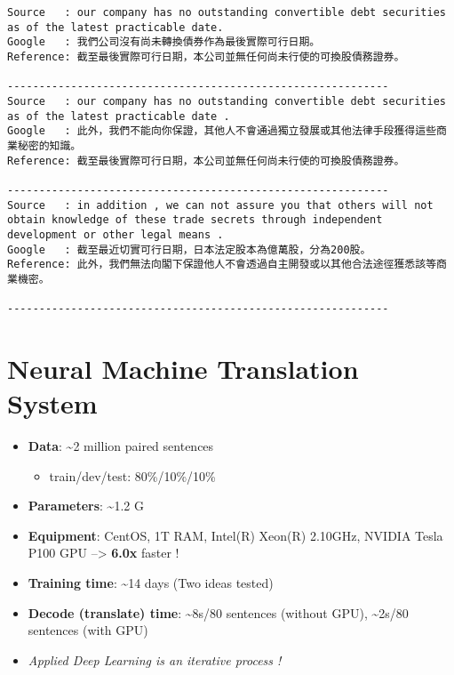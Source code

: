 \documentclass[11pt]{article}
\providecommand{\tightlist}{%
      \setlength{\itemsep}{0pt}\setlength{\parskip}{0pt}}
\begin{document}
    \begin{Verbatim}[commandchars=\\\{\}]
Source   : our company has no outstanding convertible debt securities as of the latest practicable date.
Google   : 我們公司沒有尚未轉換債券作為最後實際可行日期。
Reference: 截至最後實際可行日期，本公司並無任何尚未行使的可換股債務證券。

------------------------------------------------------------
Source   : our company has no outstanding convertible debt securities as of the latest practicable date .
Google   : 此外，我們不能向你保證，其他人不會通過獨立發展或其他法律手段獲得這些商業秘密的知識。
Reference: 截至最後實際可行日期，本公司並無任何尚未行使的可換股債務證券。

------------------------------------------------------------
Source   : in addition , we can not assure you that others will not obtain knowledge of these trade secrets through independent development or other legal means .
Google   : 截至最近切實可行日期，日本法定股本為億萬股，分為200股。
Reference: 此外，我們無法向閣下保證他人不會透過自主開發或以其他合法途徑獲悉該等商業機密。

------------------------------------------------------------

    \end{Verbatim}

    \section{Neural Machine Translation
System}\label{neural-machine-translation-system}

\begin{itemize}
\tightlist
\item
  \textbf{Data}: \textasciitilde{}2 million paired sentences

  \begin{itemize}
  \tightlist
  \item
    train/dev/test: 80\%/10\%/10\%
  \end{itemize}
\item
  \textbf{Parameters}: \textasciitilde{}1.2 G
\item
  \textbf{Equipment}: CentOS, 1T RAM, Intel(R) Xeon(R) 2.10GHz, NVIDIA
  Tesla P100 GPU --\textgreater{} \textbf{6.0x} faster !
\item
  \textbf{Training time}: \textasciitilde{}14 days (Two ideas tested)
\item
  \textbf{Decode (translate) time}: \textasciitilde{}8s/80 sentences
  (without GPU), \textasciitilde{}2s/80 sentences (with GPU)
\item
  \emph{Applied Deep Learning is an iterative process !}
\end{itemize}
\end{document}
